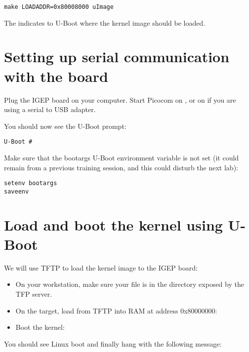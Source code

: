 \begin{verbatim}
make LOADADDR=0x80008000 uImage
\end{verbatim}

The  indicates to U-Boot where the kernel image should
be loaded.

\section{Setting up serial communication with the board}

Plug the IGEP board on your computer. Start Picocom on
, or on  if you are using a serial
to USB adapter.

You should now see the U-Boot prompt:

\begin{verbatim}
U-Boot #
\end{verbatim}

Make sure that the bootargs U-Boot environment variable is not set (it
could remain from a previous training session, and this could disturb
the next lab):

\begin{verbatim}
setenv bootargs
saveenv
\end{verbatim}

\section{Load and boot the kernel using U-Boot}

We will use TFTP to load the kernel image to the IGEP board:

\begin{itemize}

\item On your workstation, make sure your  file is in the
  directory exposed by the TFP server.

\item On the target, load  from TFTP into RAM at address
  0x80000000:\\

\item Boot the kernel:\\

\end{itemize}

You should see Linux boot and finally hang with the following message:

